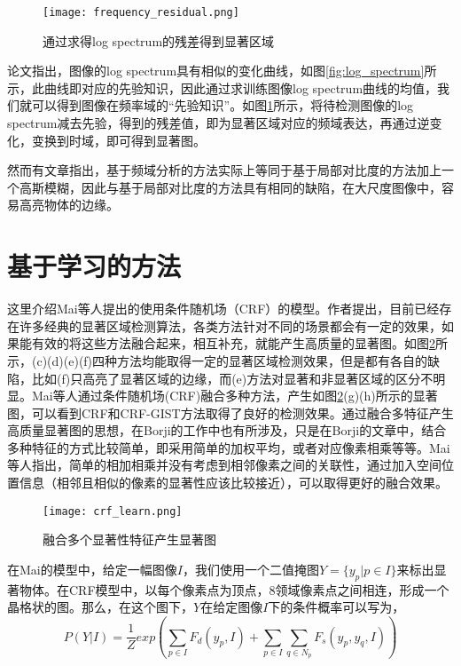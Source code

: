 \begin{figure}[t]
\centering
\texttt{[image: frequency\_residual.png]}
\caption{通过求得log spectrum的残差得到显著区域}\label{fig:frequency_residual}
\end{figure}

论文指出，图像的log spectrum具有相似的变化曲线，如图\ref{fig:log_spectrum}所示，此曲线即对应的先验知识，因此通过求训练图像log spectrum曲线的均值，我们就可以得到图像在频率域的“先验知识”。如图\ref{fig:frequency_residual}所示，将待检测图像的log spectrum减去先验，得到的残差值，即为显著区域对应的频域表达，再通过逆变化，变换到时域，即可得到显著图。

然而有文章\cite{hou2012image}指出，基于频域分析的方法实际上等同于基于局部对比度的方法加上一个高斯模糊，因此与基于局部对比度的方法具有相同的缺陷，在大尺度图像中，容易高亮物体的边缘。

\section{基于学习的方法}
这里介绍Mai等人\cite{maisaliency}提出的使用条件随机场（CRF）的模型。作者提出，目前已经存在许多经典的显著区域检测算法，各类方法针对不同的场景都会有一定的效果，如果能有效的将这些方法融合起来，相互补充，就能产生高质量的显著图。如图\ref{fig:crf_learn}所示，(c)(d)(e)(f)四种方法均能取得一定的显著区域检测效果，但是都有各自的缺陷，比如(f)只高亮了显著区域的边缘，而(e)方法对显著和非显著区域的区分不明显。Mai等人通过条件随机场(CRF)融合多种方法，产生如图\ref{fig:crf_learn}(g)(h)所示的显著图，可以看到CRF和CRF-GIST方法取得了良好的检测效果。通过融合多特征产生高质量显著图的思想，在Borji的工作中\cite{borji2012salient}也有所涉及，只是在Borji的文章中，结合多种特征的方式比较简单，即采用简单的加权平均，或者对应像素相乘等等。Mai等人指出\cite{maisaliency}，简单的相加相乘并没有考虑到相邻像素之间的关联性，通过加入空间位置信息（相邻且相似的像素的显著性应该比较接近），可以取得更好的融合效果。

\begin{figure}[h]
\centering
\texttt{[image: crf\_learn.png]}
\caption{融合多个显著性特征产生显著图}\label{fig:crf_learn}
\end{figure}

在Mai的模型中，给定一幅图像$I$，我们使用一个二值掩图$Y=\{y_p|p\in I\}$来标出显著物体。在CRF模型中，以每个像素点为顶点，8领域像素点之间相连，形成一个晶格状的图。那么，在这个图下，$Y$在给定图像$I$下的条件概率可以写为，
\begin{equation}
P(Y|I) = \frac{1}{Z}exp(\sum_{p\in I}F_d(y_p, I) + \sum_{p\in I}\sum_{q\in N_p}F_s(y_p,y_q,I) )
\end{equation}

